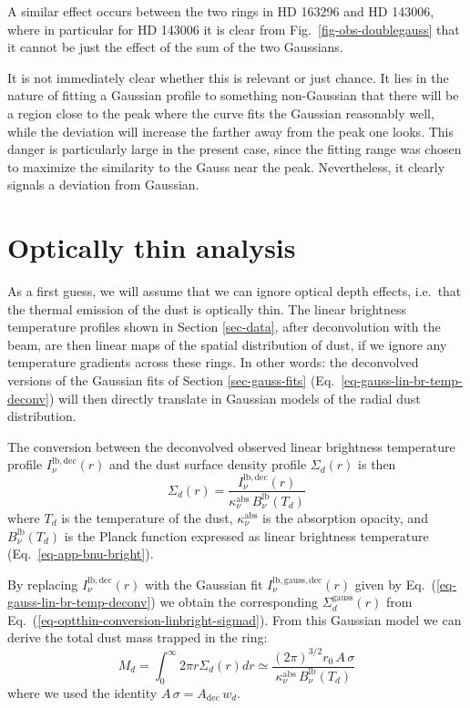 \documentclass{aa}
\begin{document}
A similar effect occurs between the two rings in HD 163296 and HD 143006, where
in particular for HD 143006 it is clear from Fig.~\ref{fig-obs-doublegauss} that
it cannot be just the effect of the sum of the two Gaussians.

It is not immediately clear whether this is relevant or just chance. It lies in
the nature of fitting a Gaussian profile to something non-Gaussian that there
will be a region close to the peak where the curve fits the Gaussian reasonably
well, while the deviation will increase the farther away from the peak one
looks. This danger is particularly large in the present case, since the fitting
range was chosen to maximize the similarity to the Gauss near the
peak. Nevertheless, it clearly signals a deviation from Gaussian.



\section{Optically thin analysis}
\label{sec-opt-thin-analysis}
%
As a first guess, we will assume that we can ignore optical depth effects,
i.e.\ that the thermal emission of the dust is optically thin. The linear
brightness temperature profiles shown in Section \ref{sec-data}, after
deconvolution with the beam, are then linear maps of the spatial distribution of
dust, if we ignore any temperature gradients across these rings.  In other
words: the deconvolved versions of the Gaussian fits of Section
\ref{sec-gauss-fits} (Eq.~\ref{eq-gauss-lin-br-temp-deconv}) will then directly
translate in Gaussian models of the radial dust distribution.

The conversion between the deconvolved observed linear brightness temperature
profile $I_\nu^{\mathrm{lb,dec}}(r)$ and the dust surface density profile
$\Sigma_d(r)$ is then
\begin{equation}\label{eq-optthin-conversion-linbright-sigmad}
  \Sigma_d(r) =  \frac{I_\nu^{\mathrm{lb,dec}}(r)}{\kappa_\nu^{\mathrm{abs}}\, B_\nu^{\mathrm{lb}}(T_d)} 
\end{equation}
where $T_d$ is the temperature of the dust, $\kappa_\nu^{\mathrm{abs}}$ is the
absorption opacity, and $B_\nu^{\mathrm{lb}}(T_d)$ is the Planck function
expressed as linear brightness temperature (Eq.~\ref{eq-app-bnu-bright}).

By replacing $I_\nu^{\mathrm{lb,dec}}(r)$ with the Gaussian fit
$I_\nu^{\mathrm{lb,gauss,dec}}(r)$ given by
Eq.~(\ref{eq-gauss-lin-br-temp-deconv}) we obtain the corresponding
$\Sigma_d^{\mathrm{gauss}}(r)$ from
Eq.~(\ref{eq-optthin-conversion-linbright-sigmad}). From this Gaussian
model we can derive the total dust mass trapped in the ring:
\begin{equation}\label{eq-dust-mass-estimate}
  M_d = \int_0^\infty 2\pi r \Sigma_d(r) dr \simeq
  \frac{(2\pi)^{3/2} r_0\, A\,\sigma}{\kappa_\nu^{\mathrm{abs}}\, B_\nu^{\mathrm{lb}}(T_d)}
\end{equation}
where we used the identity $A\,\sigma=A_{\mathrm{dec}}\,w_d$.
\end{document}
